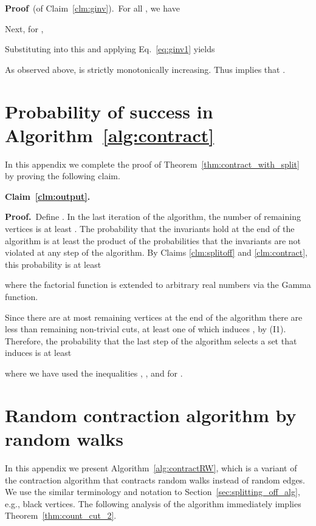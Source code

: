 \documentclass[11pt]{article}
\newcommand{\proofbelow}{8pt}
\numberwithin{equation}{section}
\renewenvironment{proof}{\noindent\textbf{Proof.}\,}{\afterproof}
\newenvironment{proofof}[1]{\noindent\textbf{Proof} \,(of #1).\,}{\afterproof}
\newcommand{\afterproof}{\hfill  \par \vspace{\proofbelow}}
\newcommand{\repeatclaim}[2]{\vspace{6pt}\noindent\textbf{#1. }{\it #2} \vspace{6pt}}
\newcommand{\Algorithm}[1]{Algorithm~\ref{alg:#1}}
\newcommand{\AppendixName}[1]{\label{app:#1}}
\newcommand{\Claim}[1]{Claim~\ref{clm:#1}}
\newcommand{\Equation}[1]{Eq.~\eqref{eq:#1}}
\newcommand{\Section}[1]{Section~\ref{sec:#1}}
\newcommand{\Theorem}[1]{Theorem~\ref{thm:#1}}
\begin{document}
\vspace{6pt}
\begin{proofof}{\Claim{ginv}}
For all , we have

Next, for ,

Substituting  into this and applying \Equation{ginv1} yields

As observed above,  is strictly monotonically increasing.
Thus  implies that .
\end{proofof}



\section{Probability of success in \Algorithm{contract}}
\AppendixName{contract_alg}

In this appendix we complete the proof of \Theorem{contract_with_split}
by proving the following claim.

\repeatclaim{\Claim{output}}{\clmoutput}

\begin{proof}
Define .
In the last iteration of the algorithm, the number of remaining vertices is at least .
The probability that the invariants hold at the end of the algorithm
is at least the product of the probabilities that the 
invariants are not violated at any step of the algorithm.
By Claims \ref{clm:splitoff} and \ref{clm:contract}, this probability is at least

where the factorial function is extended to arbitrary real numbers via the Gamma function.

Since there are at most  remaining vertices at the end of the algorithm
there are less than  remaining non-trivial cuts,
at least one of which induces , by (I1).
Therefore, the probability that the last step of the algorithm
selects a set  that induces  is at least

where we have used the inequalities ,
,
and  for .
\end{proof}





\section{Random contraction algorithm by random walks}
\AppendixName{random_walk_alg}

In this appendix we present \Algorithm{contractRW},
which is a variant of the contraction algorithm that contracts
random walks instead of random edges.
We use the similar terminology and notation to \Section{splitting_off_alg},
e.g., black vertices.
The following analysis of the algorithm immediately implies \Theorem{count_cut_2}.
\end{document}

